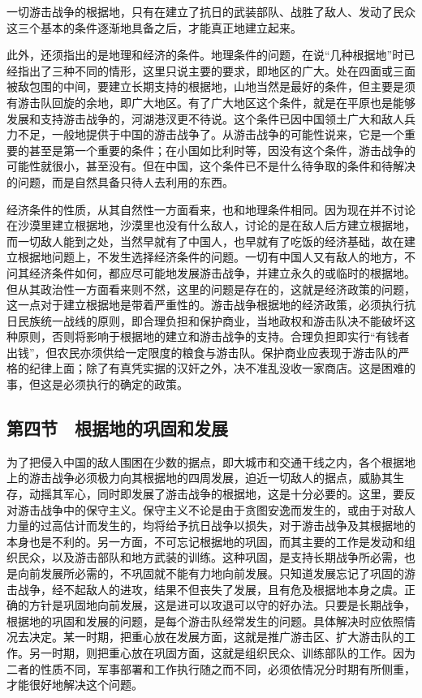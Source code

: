 一切游击战争的根据地，只有在建立了抗日的武装部队、战胜了敌人、发动了民众这三个基本的条件逐渐地具备之后，才能真正地建立起来。

此外，还须指出的是地理和经济的条件。地理条件的问题，在说“几种根据地”时已经指出了三种不同的情形，这里只说主要的要求，即地区的广大。处在四面或三面被敌包围的中间，要建立长期支持的根据地，山地当然是最好的条件，但主要是须有游击队回旋的余地，即广大地区。有了广大地区这个条件，就是在平原也是能够发展和支持游击战争的，河湖港汊更不待说。这个条件已因中国领土广大和敌人兵力不足，一般地提供于中国的游击战争了。从游击战争的可能性说来，它是一个重要的甚至是第一个重要的条件；在小国如比利时等，因没有这个条件，游击战争的可能性就很小，甚至没有。但在中国，这个条件已不是什么待争取的条件和待解决的问题，而是自然具备只待人去利用的东西。

经济条件的性质，从其自然性一方面看来，也和地理条件相同。因为现在并不讨论在沙漠里建立根据地，沙漠里也没有什么敌人，讨论的是在敌人后方建立根据地，而一切敌人能到之处，当然早就有了中国人，也早就有了吃饭的经济基础，故在建立根据地问题上，不发生选择经济条件的问题。一切有中国人又有敌人的地方，不问其经济条件如何，都应尽可能地发展游击战争，并建立永久的或临时的根据地。但从其政治性一方面看来则不然，这里的问题是存在的，这就是经济政策的问题，这一点对于建立根据地是带着严重性的。游击战争根据地的经济政策，必须执行抗日民族统一战线的原则，即合理负担和保护商业，当地政权和游击队决不能破坏这种原则，否则将影响于根据地的建立和游击战争的支持。合理负担即实行“有钱者出钱”，但农民亦须供给一定限度的粮食与游击队。保护商业应表现于游击队的严格的纪律上面；除了有真凭实据的汉奸之外，决不准乱没收一家商店。这是困难的事，但这是必须执行的确定的政策。

\subsection{第四节　根据地的巩固和发展}

为了把侵入中国的敌人围困在少数的据点，即大城市和交通干线之内，各个根据地上的游击战争必须极力向其根据地的四周发展，迫近一切敌人的据点，威胁其生存，动摇其军心，同时即发展了游击战争的根据地，这是十分必要的。这里，要反对游击战争中的保守主义。保守主义不论是由于贪图安逸而发生的，或由于对敌人力量的过高估计而发生的，均将给予抗日战争以损失，对于游击战争及其根据地的本身也是不利的。另一方面，不可忘记根据地的巩固，而其主要的工作是发动和组织民众，以及游击部队和地方武装的训练。这种巩固，是支持长期战争所必需，也是向前发展所必需的，不巩固就不能有力地向前发展。只知道发展忘记了巩固的游击战争，经不起敌人的进攻，结果不但丧失了发展，且有危及根据地本身之虞。正确的方针是巩固地向前发展，这是进可以攻退可以守的好办法。只要是长期战争，根据地的巩固和发展的问题，是每个游击队经常发生的问题。具体解决时应依照情况去决定。某一时期，把重心放在发展方面，这就是推广游击区、扩大游击队的工作。另一时期，则把重心放在巩固方面，这就是组织民众、训练部队的工作。因为二者的性质不同，军事部署和工作执行随之而不同，必须依情况分时期有所侧重，才能很好地解决这个问题。

